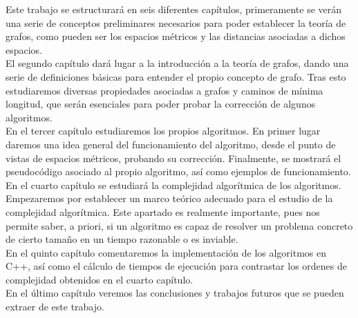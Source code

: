 Este trabajo se estructurará en seis diferentes capítulos, primeramente se verán una serie de conceptos preliminares necesarios para poder establecer la teoría de grafos, como pueden ser los espacios métricos y las distancias asociadas a dichos espacios. \\

El segundo capítulo dará lugar a la introducción a la teoría de grafos, dando una serie de definiciones básicas para entender el propio concepto de grafo. Tras esto estudiaremos diversas propiedades asociadas a grafos y caminos de mínima longitud, que serán esenciales para poder probar la corrección de algunos algoritmos. \\

En el tercer capítulo estudiaremos los propios algoritmos. En primer lugar daremos una idea general del funcionamiento del algoritmo, desde el punto de vistas de espacios métricos, probando su corrección. Finalmente, se mostrará el pseudocódigo asociado al propio algoritmo, así como ejemplos de funcionamiento. \\

En el cuarto capítulo se estudiará la complejidad algorítmica de los algoritmos. Empezaremos por establecer un marco teórico adecuado para el estudio de la complejidad algorítmica. Este apartado es realmente importante, pues nos permite saber, a priori, si un algoritmo es capaz de resolver un problema concreto de cierto tamaño en un tiempo razonable o es inviable. \\

En el quinto capítulo comentaremos la implementación de los algoritmos en C++, así como el cálculo de tiempos de ejecución para contrastar los ordenes de complejidad obtenidos en el cuarto capítulo. \\

En el último capítulo veremos las conclusiones y trabajos futuros que se pueden extraer de este trabajo.


\endinput
